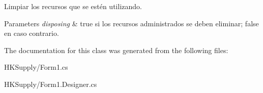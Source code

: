 Limpiar los recursos que se estén utilizando. 


\begin{DoxyParams}{Parameters}
{\em disposing} & true si los recursos administrados se deben eliminar; false en caso contrario.\\
\hline
\end{DoxyParams}


The documentation for this class was generated from the following files\+:\begin{DoxyCompactItemize}
\item 
H\+K\+Supply/Form1.\+cs\item 
H\+K\+Supply/Form1.\+Designer.\+cs\end{DoxyCompactItemize}
